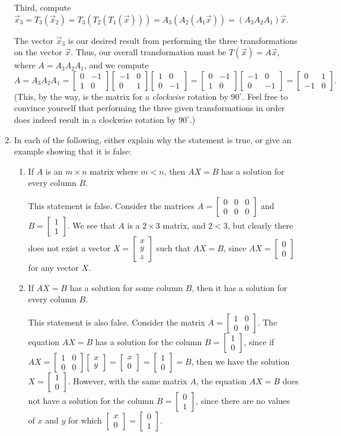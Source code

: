 \documentclass[letterpaper,12pt]{amsart}
\newcommand{\bbm}{\begin{bmatrix}}
\newcommand{\ebm}{\end{bmatrix}}
\begin{document}
\begin{enumerate}
Third, compute $\vec{x}_3 = T_3(\vec{x}_2) = T_3(T_2(T_1(\vec{x}))) = A_3(A_2(A_1\vec{x})) = (A_3A_2A_1)\vec{x}$.

The vector $\vec{x}_3$ is our desired result from performing the three transformations on the vector $\vec{x}$. Thus, our overall transformation must be $T(\vec{x}) = A\vec{x}$, where $A = A_3A_2A_1$, and we compute
\[
 A = A_3A_2A_1 = \bbm 0&-1\\1&0\ebm\bbm -1&0\\0&1\ebm\bbm 1&0\\0&-1\ebm = \bbm 0&-1\\1&0\ebm\bbm -1&0\\0&-1\ebm = \bbm 0&1\\-1&0\ebm.
\]
(This, by the way, is the matrix for a {\em clockwise} rotation by $90^\circ$. Feel free to convince yourself that performing the three given transformations in order does indeed result in a clockwise rotation by $90^\circ$.)

\bigskip


\item In each of the following, either explain why the statement is true, or give an example showing that it is false:
 \begin{enumerate}
 \item If $A$ is an $m\times n$ matrix where $m<n$, then $AX=B$ has a solution for every column $B$.

\bigskip

This statement is false. Consider the matrices $A = \bbm 0&0&0\\0&0&0\ebm$ and $B = \bbm 1\\1\ebm$. We see that $A$ is a $2\times 3$ matrix, and $2<3$, but clearly there does not exist a vector $X = \bbm x\\y\\z\ebm$ such that $AX=B$, since $AX = \bbm 0\\0\ebm$ for any vector $X$.

\bigskip


 \item If $AX=B$ has a solution for some column $B$, then it has a solution for every column $B$.

\bigskip

This statement is also false. Consider the matrix $A = \bbm 1&0\\0&0\ebm$. The equation $AX=B$ has a solution for the column $B = \bbm 1\\0\ebm$, since if $AX = \bbm 1&0\\0&0\ebm \bbm x\\y\ebm = \bbm x\\0\ebm = \bbm 1\\0\ebm = B$, then we have the solution $X = \bbm 1\\0\ebm$. However, with the same matrix $A$, the equation $AX=B$ does not have a solution for the column $B=\bbm 0\\1\ebm$, since there are no values of $x$ and $y$ for which $\bbm x\\0\ebm = \bbm 0\\1\ebm$.


\end{enumerate}
\end{enumerate}
\end{document}
